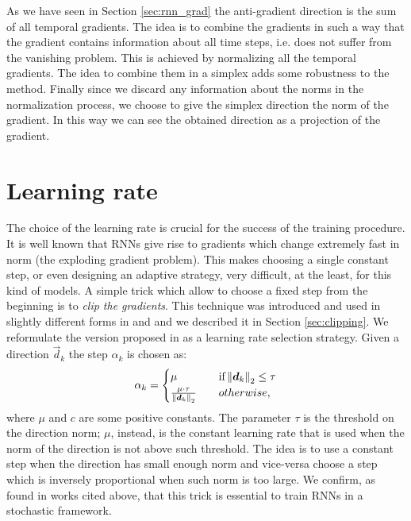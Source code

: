 As we have seen in Section \ref{sec:rnn_grad} the anti-gradient direction is the sum of all temporal gradients. The idea is to combine the gradients in such a way that the gradient contains information about all time steps, i.e. does not suffer from the vanishing problem. This is achieved by normalizing all the temporal gradients. The idea to combine them in a simplex adds some robustness to the method. Finally since we discard any information about the norms in the normalization process, we choose to give the simplex direction the norm of the gradient. In this way we can see the obtained direction as a projection of the gradient.


\section{Learning rate}

The choice of the learning rate is crucial for the success of the training procedure. It is well known that RNNs give rise to gradients which change extremely fast in norm (the exploding gradient problem). This makes choosing a single constant step, or even designing an adaptive strategy, very difficult, at the least, for this kind of models. A simple trick which allow to choose a fixed step from the beginning is to \textit{clip the gradients}. This technique was introduced and used in slightly different forms in \cite{understandingExplodingGradients} and \cite{clippingMikolov} and we described it in Section \ref{sec:clipping}. We reformulate the version proposed in \cite{understandingExplodingGradients} as a learning rate selection strategy.
Given a direction $\vec{d}_k$ the step $\alpha_k$ is chosen as:
\begin{equation}
\alpha_k = 
\begin{cases}
	\mu  \quad &\mbox{if} \left\Vert \boldsymbol{d}_k \right\Vert_2 \leq \tau\\
	\frac{\mu \cdot \tau}{\left\Vert \boldsymbol{d}_k \right\Vert_2} \quad & otherwise,
\end{cases}
\end{equation}
where $\mu$ and $c$ are some positive constants. The parameter $\tau$ is the threshold on the direction norm; $\mu$, instead, is the constant learning rate that is used when the norm of the direction is not above such threshold. The idea is to use a constant step when the direction has small enough norm and vice-versa choose a step which is inversely proportional when such norm is too large. We confirm, as found in works cited above, that this trick is essential to train RNNs in a stochastic framework.

